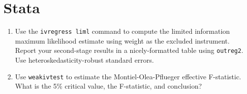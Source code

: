 \documentclass{article}
\begin{document}
\section{Stata}

\begin{enumerate}
    \item Use the \verb|ivregress liml| command to compute the limited information maximum likelihood estimate using weight as the excluded instrument.  Report your second-stage results in a nicely-formatted table using \verb|outreg2|.  Use heteroskedasticity-robust standard errors.
    \item Use \verb|weakivtest| to estimate the Montiel-Olea-Pflueger effective F-statistic.  What is the 5\% critical value, the F-statistic, and conclusion?
\end{enumerate}
\end{document}
